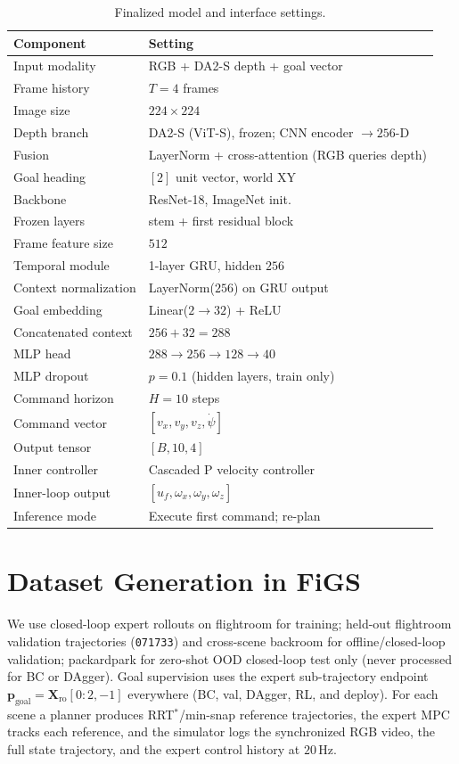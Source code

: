 \documentclass[10pt,twocolumn,letterpaper]{article}
\begin{document}
\begin{table}[t]
\centering
\caption{Finalized model and interface settings.}
\label{tab:params}
\small
\begin{tabular}{@{}ll@{}}
\toprule
\textbf{Component} & \textbf{Setting} \\
\midrule
Input modality & RGB + DA2-S depth + goal vector \\
Frame history & $T=4$ frames \\
Image size & $224\times224$ \\
Depth branch & DA2-S (ViT-S), frozen; CNN encoder $\to 256$-D \\
Fusion & LayerNorm + cross-attention (RGB queries depth) \\
Goal heading & $[2]$ unit vector, world XY \\
Backbone & ResNet-18, ImageNet init.\ \\
Frozen layers & stem + first residual block \\
Frame feature size & $512$ \\
Temporal module & 1-layer GRU, hidden $256$ \\
Context normalization & LayerNorm($256$) on GRU output \\
Goal embedding & Linear($2{\to}32$) + ReLU \\
Concatenated context & $256 + 32 = 288$ \\
MLP head & $288\!\to\!256\!\to\!128\!\to\!40$ \\
MLP dropout & $p=0.1$ (hidden layers, train only) \\
Command horizon & $H=10$ steps \\
Command vector & $[v_x, v_y, v_z, \dot{\psi}]$ \\
Output tensor & $[B,10,4]$ \\
Inner controller & Cascaded P velocity controller \\
Inner-loop output & $[u_f, \omega_x, \omega_y, \omega_z]$ \\
Inference mode & Execute first command; re-plan \\
\bottomrule
\end{tabular}
\end{table}

\section{Dataset Generation in FiGS}
\label{sec:data}

We use closed-loop expert rollouts on flightroom for training; held-out flightroom validation trajectories (\texttt{071733}) and cross-scene backroom for offline/closed-loop validation; packardpark for zero-shot OOD closed-loop test only (never processed for BC or DAgger). Goal supervision uses the expert sub-trajectory endpoint $\mathbf{p}_{\mathrm{goal}} = \mathbf{X}_{\mathrm{ro}}[0{:}2,-1]$ everywhere (BC, val, DAgger, RL, and deploy). For each scene a planner produces RRT$^{*}$/min-snap reference trajectories, the expert MPC tracks each reference, and the simulator logs the synchronized RGB video, the full state trajectory, and the expert control history at $20\,\mathrm{Hz}$.
\end{document}
